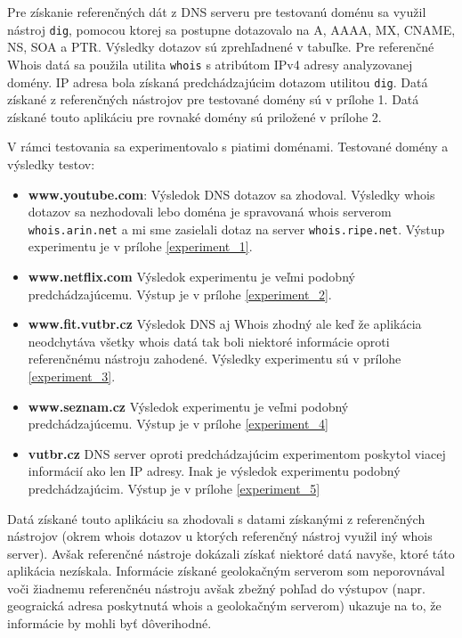 \documentclass[a4paper, 11pt]{article}
\begin{document}
Pre získanie referenčných dát z DNS serveru pre testovanú doménu sa využil nástroj \texttt{dig}, pomocou ktorej sa postupne dotazovalo na A, AAAA, MX, CNAME, NS, SOA a PTR. Výsledky dotazov sú zprehľadnené v tabuľke. Pre referenčné Whois datá sa použila utilita \texttt{whois} s atribútom IPv4 adresy analyzovanej domény. IP adresa bola získaná predchádzajúcim dotazom utilitou \texttt{dig}. Datá získané z referenčných nástrojov pre testované domény sú v prílohe 1. Datá získané touto aplikáciu pre rovnaké domény sú priložené v prílohe 2. 

V rámci testovania sa experimentovalo s piatimi doménami. Testované domény a výsledky testov:
\begin{itemize}
	\item \textbf{www.youtube.com}: Výsledok DNS dotazov sa zhodoval. Výsledky whois dotazov sa nezhodovali lebo doména je spravovaná whois serverom \texttt{whois.arin.net} a mi sme zasielali dotaz na server \texttt{whois.ripe.net}. Výstup experimentu je v prílohe \ref{experiment_1}.
	\item \textbf{www.netflix.com} Výsledok experimentu je veľmi podobný predchádzajúcemu. Výstup je v prílohe \ref{experiment_2}.
	\item \textbf{www.fit.vutbr.cz} Výsledok DNS aj Whois zhodný ale keď že aplikácia neodchytáva všetky whois datá tak boli niektoré informácie oproti referenčnému nástroju zahodené. Výsledky experimentu sú v prílohe \ref{experiment_3}.
	\item \textbf{www.seznam.cz} Výsledok experimentu je veľmi podobný predchádzajúcemu. Výstup je v prílohe  \ref{experiment_4}
	\item \textbf{vutbr.cz} DNS server oproti predchádzajúcim experimentom poskytol viacej informácií ako len IP adresy. Inak je výsledok experimentu podobný predchádzajúcim. Výstup je v prílohe \ref{experiment_5}
\end{itemize}
Datá získané touto aplikáciu sa zhodovali s datami získanými z referenčných nástrojov (okrem whois dotazov u ktorých referenčný nástroj využil iný whois server). Avšak referenčné nástroje dokázali získať niektoré datá navyše, ktoré táto aplikácia nezískala. Informácie získané geolokačným serverom som neporovnával voči žiadnemu referenčnéu nástroju avšak zbežný pohľad do výstupov (napr. geograická adresa poskytnutá whois a geolokačným serverom) ukazuje na to, že informácie by mohli byť dôverihodné.

\newpage


\end{document}
